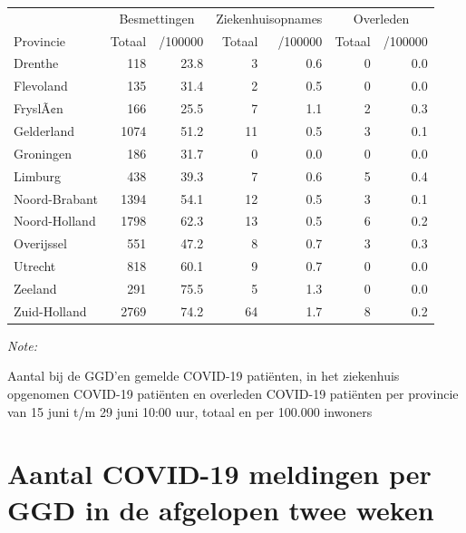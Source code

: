 \documentclass[
  english,
  man,floatsintext]{apa6}
\begin{document}
\begin{table}
\centering
\begin{threeparttable}
\begin{tabular}{lrrrrrr}
\toprule
\multicolumn{1}{c}{ } & \multicolumn{2}{c}{Besmettingen} & \multicolumn{2}{c}{Ziekenhuisopnames} & \multicolumn{2}{c}{Overleden} \\
\cmidrule(l{3pt}r{3pt}){2-3} \cmidrule(l{3pt}r{3pt}){4-5} \cmidrule(l{3pt}r{3pt}){6-7}
Provincie & Totaal & /100000 & Totaal & /100000 & Totaal & /100000\\
\midrule
Drenthe & 118 & 23.8 & 3 & 0.6 & 0 & 0.0\\
Flevoland & 135 & 31.4 & 2 & 0.5 & 0 & 0.0\\
FryslÃ¢n & 166 & 25.5 & 7 & 1.1 & 2 & 0.3\\
Gelderland & 1074 & 51.2 & 11 & 0.5 & 3 & 0.1\\
Groningen & 186 & 31.7 & 0 & 0.0 & 0 & 0.0\\
Limburg & 438 & 39.3 & 7 & 0.6 & 5 & 0.4\\
Noord-Brabant & 1394 & 54.1 & 12 & 0.5 & 3 & 0.1\\
Noord-Holland & 1798 & 62.3 & 13 & 0.5 & 6 & 0.2\\
Overijssel & 551 & 47.2 & 8 & 0.7 & 3 & 0.3\\
Utrecht & 818 & 60.1 & 9 & 0.7 & 0 & 0.0\\
Zeeland & 291 & 75.5 & 5 & 1.3 & 0 & 0.0\\
Zuid-Holland & 2769 & 74.2 & 64 & 1.7 & 8 & 0.2\\
\bottomrule
\end{tabular}
\begin{tablenotes}
\item \textit{Note: } 
\item Aantal bij de GGD’en gemelde COVID-19 patiënten, in het ziekenhuis opgenomen COVID-19 patiënten en overleden COVID-19 patiënten per provincie van 15 juni t/m 29 juni 10:00 uur, totaal en per 100.000 inwoners
\end{tablenotes}
\end{threeparttable}
\end{table}

\newpage

\hypertarget{aantal-covid-19-meldingen-per-ggd-in-de-afgelopen-twee-weken}{%
\section{Aantal COVID-19 meldingen per GGD in de afgelopen twee weken}\label{aantal-covid-19-meldingen-per-ggd-in-de-afgelopen-twee-weken}}
\end{document}
